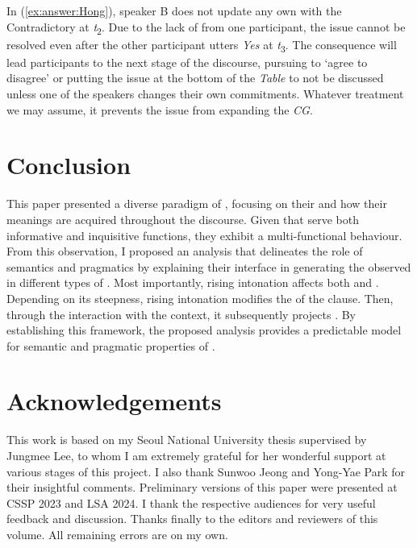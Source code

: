 \documentclass[output=paper,colorlinks,citecolor=brown]{langscibook}
\begin{document}
In (\ref{ex:answer:Hong}), speaker B does not update any own  with the Contradictory  at \textit{t}\textsubscript{2}. Due to the lack of  from one participant, the issue cannot be resolved even after the other participant utters \textit{Yes} at \textit{t}\textsubscript{3}. The consequence will lead participants to the next stage of the discourse, pursuing to `agree to disagree' \citep{farkas2010reacting} or putting the issue at the bottom of the \textit{Table} to not be discussed unless one of the speakers changes their own commitments. Whatever treatment we may assume, it prevents the issue from expanding the \textit{CG}.

\section{Conclusion}
\label{sec:conc:Hong}

This paper presented a diverse paradigm of , focusing on their  and how their meanings are acquired throughout the discourse. Given that  serve both informative and inquisitive functions, they exhibit a multi-functional behaviour. From this observation, I proposed an analysis that delineates the role of semantics and pragmatics by explaining their interface in generating the  observed in different types of . Most importantly, rising intonation
affects both  and . Depending on its steepness, rising intonation modifies the  of the clause. Then, through the interaction with the context, it subsequently projects . By establishing this framework, the proposed analysis provides a predictable model for semantic and pragmatic properties of .


\section*{Acknowledgements}

This work is based on my Seoul National University thesis \citep{hong2023semantics} supervised by Jungmee Lee, to whom I am extremely grateful for her wonderful support at various stages of this project. I also thank Sunwoo Jeong and Yong-Yae Park for their insightful comments. Preliminary versions of this paper were presented at CSSP 2023 and LSA 2024. I thank the respective audiences for very useful feedback and discussion. Thanks finally to the editors and reviewers of this volume. All remaining errors are on my own.

\sloppy
\printbibliography[heading=subbibliography,notkeyword=this]
\end{document}
